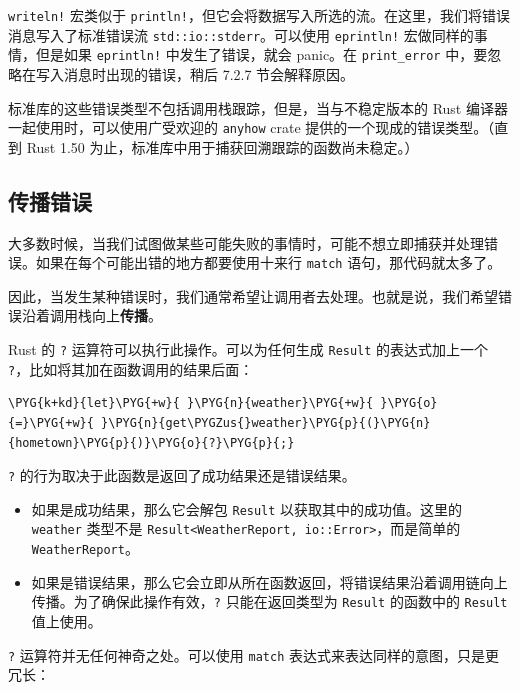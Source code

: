 \texttt{writeln!} 宏类似于 \texttt{println!}，但它会将数据写入所选的流。在这里，我们将错误消息写入了标准错误流 \texttt{std::io::stderr}。可以使用 \texttt{eprintln!} 宏做同样的事情，但是如果 \texttt{eprintln!} 中发生了错误，就会 panic。在 \texttt{print\_error} 中，要忽略在写入消息时出现的错误，稍后 7.2.7 节会解释原因。

标准库的这些错误类型不包括调用栈跟踪，但是，当与不稳定版本的 Rust 编译器一起使用时，可以使用广受欢迎的 \texttt{anyhow} crate 提供的一个现成的错误类型。（直到 Rust 1.50 为止，标准库中用于捕获回溯跟踪的函数尚未稳定。）

\subsection{传播错误}

大多数时候，当我们试图做某些可能失败的事情时，可能不想立即捕获并处理错误。如果在每个可能出错的地方都要使用十来行 \texttt{match} 语句，那代码就太多了。

因此，当发生某种错误时，我们通常希望让调用者去处理。也就是说，我们希望错误沿着调用栈向上\textbf{传播}。

Rust 的 \texttt{?} 运算符可以执行此操作。可以为任何生成 \texttt{Result} 的表达式加上一个 \texttt{?}，比如将其加在函数调用的结果后面：

\begin{Verbatim}[commandchars=\\\{\},breaklines=true,breakanywhere=true,fontsize=\codefont,xleftmargin=17bp]
\PYG{k+kd}{let}\PYG{+w}{ }\PYG{n}{weather}\PYG{+w}{ }\PYG{o}{=}\PYG{+w}{ }\PYG{n}{get\PYGZus{}weather}\PYG{p}{(}\PYG{n}{hometown}\PYG{p}{)}\PYG{o}{?}\PYG{p}{;}
\end{Verbatim}

\texttt{?} 的行为取决于此函数是返回了成功结果还是错误结果。

\begin{itemize}
\item 如果是成功结果，那么它会解包 \texttt{Result} 以获取其中的成功值。这里的 \texttt{weather} 类型不是 \texttt{Result<WeatherReport, io::Error>}，而是简单的 \texttt{WeatherReport}。
\item 如果是错误结果，那么它会立即从所在函数返回，将错误结果沿着调用链向上传播。为了确保此操作有效，\texttt{?} 只能在返回类型为 \texttt{Result} 的函数中的 \texttt{Result} 值上使用。
\end{itemize}

\texttt{?} 运算符并无任何神奇之处。可以使用 \texttt{match} 表达式来表达同样的意图，只是更冗长：

